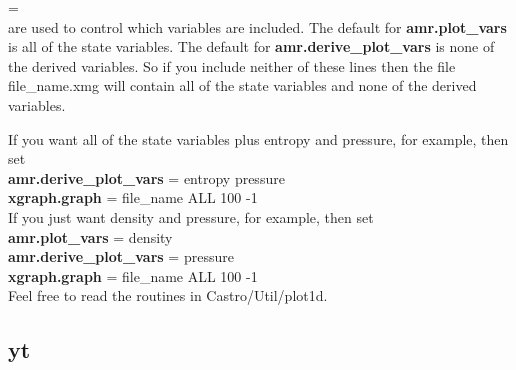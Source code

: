 = \\

\noindent are used to control which variables are included.  The default for {\bf amr.plot\_vars}
is all of the state variables.  The default for {\bf amr.derive\_plot\_vars} is none of
the derived variables.  So if you include neither of these lines then the file 
file\_name.xmg will contain all of the state variables and none of the derived variables.

If you want all of the state variables plus entropy and pressure, for example, then set \\

{\bf amr.derive\_plot\_vars} = entropy pressure \\

{\bf xgraph.graph} = file\_name ALL 100 -1\\

If you just want density and pressure, for example, then set \\

{\bf amr.plot\_vars} =  density \\

{\bf amr.derive\_plot\_vars} = pressure \\

{\bf xgraph.graph} = file\_name ALL 100 -1\\ 

Feel free to read the routines in Castro/Util/plot1d.


\subsection{yt}

